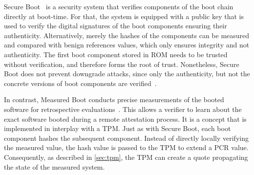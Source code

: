 
Secure Boot~\cite{Hendricks2004, UEFI, Frazelle2020} is a security system that verifies components of the boot chain directly at boot-time.
For that, the system is equipped with a public key that is used to verify the digital signatures of the boot components ensuring their authenticity.
Alternatively, merely the hashes of the components can be measured and compared with benign references values, which only ensures integrity and not authenticity.
The first boot component stored in ROM needs to be trusted without verification, and therefore forms the root of trust.
Nonetheless, Secure Boot does not prevent downgrade attacks, since only the authenticity, but not the concrete versions of boot components are verified~\cite{272306}.


In contrast, Measured Boot conducts precise measurements of the booted software for retrospective evaluations~\cite{tcgMeasuredBoot}.
This allows a verifier to learn about the exact software booted during a remote attestation process.
It is a concept that is implemented in interplay with a TPM\@.
Just as with Secure Boot, each boot component hashes the subsequent component.
Instead of directly locally verifying the measured value, the hash value is passed to the TPM to extend a \ac{PCR} value.
Consequently, as described in \autoref{sec:tpm}, the TPM can create a quote propagating the state of the measured system.


